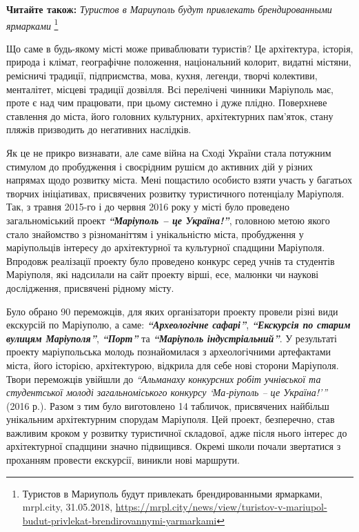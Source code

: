 \textbf{Читайте також:} \emph{Туристов в Мариуполь будут привлекать брендированными ярмарками}
\footnote{Туристов в Мариуполь будут привлекать брендированными ярмарками, mrpl.city, 31.05.2018, \url{https://mrpl.city/news/view/turistov-v-mariupol-budut-privlekat-brendirovannymi-yarmarkami}}

Що саме в будь-якому місті може приваблювати туристів? Це архітектура, історія,
природа і клімат, географічне положення, національний колорит, видатні містяни,
ремісничі традиції, підприємства, мова, кухня, легенди, творчі колективи,
менталітет, місцеві традиції дозвілля. Всі перелічені чинники Маріуполь має,
проте є над чим працювати, при цьому системно і дуже плідно. Поверхневе
ставлення до міста, його головних культурних, архітектурних пам'яток, стану
пляжів призводить до негативних наслідків.

Як це не прикро визнавати, але саме війна на Сході України стала потужним
стимулом до пробудження і своєрідним рушієм до активних дій у різних напрямах
щодо розвитку міста. Мені пощастило особисто взяти участь у багатьох творчих
ініціативах, присвячених розвитку туристичного потенціалу Маріуполя. Так, з
травня 2015-го і до червня 2016 року у місті було проведено загальноміський
проект \textbf{\emph{\enquote{Маріуполь – це Україна!}}}, головною метою якого стало знайомство з
різноманіттям і унікальністю міста, пробудження у маріупольців інтересу до
архітектурної та культурної спадщини Маріуполя. Впродовж реалізації проекту
було проведено конкурс серед учнів та студентів Маріуполя, які надсилали на
сайт проекту вірші, есе, малюнки чи наукові дослідження, присвячені рідному
місту.

Було обрано 90 переможців, для яких організатори проекту провели різні види
екскурсій по Маріуполю, а саме: \textbf{\emph{\enquote{Археологічне сафарі}}},
\textbf{\emph{\enquote{Екскурсія по старим вулицям Маріуполя}}},
\textbf{\emph{\enquote{Порт}}} та \textbf{\emph{\enquote{Маріуполь
індустріальний}}}. У результаті проекту маріупольська молодь познайомилася з
археологічними артефактами міста, його історією, архітектурою, відкрила для
себе нові сторони Маріуполя. Твори переможців увійшли до
\emph{\enquote{Альманаху конкурсних робіт учнівської та студентської молоді
загальноміського конкурсу \enquote{Ма\hyp{}ріуполь – це Україна!}}} (2016 р.). Разом
з тим було виготовлено 14 табличок, присвячених найбільш унікальним
архітектурним спорудам Маріуполя. Цей проект, безперечно, став важливим кроком
у розвитку туристичної складової, адже після нього інтерес до архітектурної
спадщини значно підвищився. Окремі школи почали звертатися з проханням провести
екскурсії, виникли нові маршрути.

